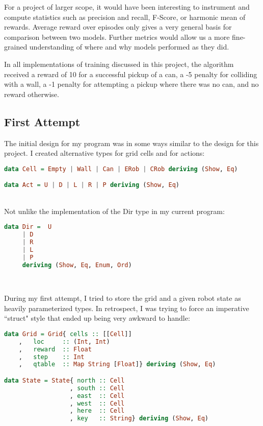 \documentclass[12pt,a4paper]{article}
\begin{document}
		\par For a project of larger scope, it would have been interesting to instrument and compute statistics such as precision and recall, F-Score, or harmonic mean of rewards. Average reward over episodes only gives a very general basis for comparison between two models. Further metrics would allow us a more fine-grained understanding of where and why models performed as they did.
		\par In all implementations of training discussed in this project, the algorithm received a reward of 10 for a successful pickup of a can, a -5 penalty for colliding with a wall, a -1 penalty for attempting a pickup where there was no can, and no reward otherwise.
	
		\subsection{First Attempt}
		
		\par The initial design for my program was in some ways similar to the design for this project. I created alternative types for grid cells and for actions:\\
		
		\begin{lstlisting}[language=Haskell,numbers=none]
data Cell = Empty | Wall | Can | ERob | CRob deriving (Show, Eq)

data Act = U | D | L | R | P deriving (Show, Eq)
		\end{lstlisting}\ \\
		
		 \noindent Not unlike the implementation of the Dir type in my current program:\\
		
		\begin{lstlisting}[language=Haskell,numbers=none]
data Dir =  U
	 | D
	 | R
	 | L
	 | P
	 deriving (Show, Eq, Enum, Ord)
		\end{lstlisting}\ \\
		
		\par During my first attempt, I tried to store the grid and a given robot state as heavily parameterized types. In retrospect, I was trying to force an imperative ``struct" style that ended up being very awkward to handle:\\
		\begin{lstlisting}[language=Haskell,numbers=none]
data Grid = Grid{ cells :: [[Cell]]
	,   loc     :: (Int, Int)
	,   reward  :: Float
	,   step    :: Int
	,   qtable  :: Map String [Float]} deriving (Show, Eq)

data State = State{ north :: Cell
                  , south :: Cell
                  , east  :: Cell
                  , west  :: Cell
                  , here  :: Cell
                  , key   :: String} deriving (Show, Eq)

		\end{lstlisting}\ \\
		
\end{document}
